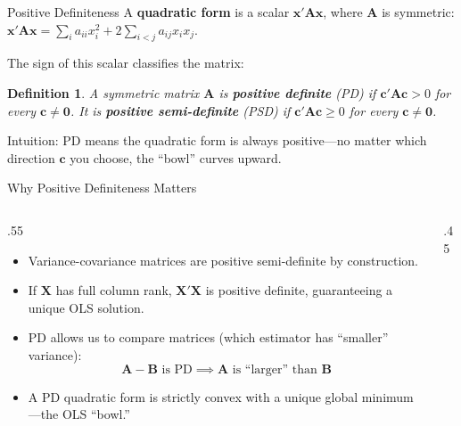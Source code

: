 \documentclass[aspectratio=169, handout, t]{beamer}
\newtheorem{defn}{Definition}
\numberwithin{equation}{section}
\begin{document}
\begin{frame}{Positive Definiteness}
A \textbf{quadratic form} is a scalar $\bm{x}'\bm{A}\bm{x}$, where $\bm{A}$ is symmetric:
$\bm{x}'\bm{A}\bm{x}=\sum_i a_{ii}x_i^2+2\sum_{i<j} a_{ij}x_ix_j.$\pause

The sign of this scalar classifies the matrix:
\begin{defn}
A symmetric matrix $\bm{A}$ is \textbf{positive definite} (PD) if
$\bm{c}'\bm{A}\bm{c}>0$ for every $\bm{c}\neq \bm{0}$.
It is \textbf{positive semi-definite} (PSD) if
$\bm{c}'\bm{A}\bm{c}\geq 0$ for every $\bm{c}\neq \bm{0}$.
\end{defn}\pause
Intuition: PD means the quadratic form is always positive---no matter which direction $\bm{c}$ you choose, the ``bowl'' curves upward.
\end{frame}

\begin{frame}{Why Positive Definiteness Matters}
\begin{columns}
\begin{column}{.55\textwidth}
\begin{itemize}
\item Variance-covariance matrices are positive semi-definite by construction.
\item If $\bm{X}$ has full column rank, $\bm{X}'\bm{X}$ is positive definite, guaranteeing a unique OLS solution.
\item PD allows us to compare matrices (which estimator has ``smaller'' variance):
$$\bm{A}-\bm{B} \text{ is PD} \implies \bm{A} \text{ is ``larger'' than } \bm{B}$$
\item A PD quadratic form is strictly convex with a unique global minimum---the OLS ``bowl.''
\end{itemize}
\end{column}
\begin{column}{.45\textwidth}
\begin{center}
\end{center}
\end{column}
\end{columns}
\end{frame}
\end{document}
